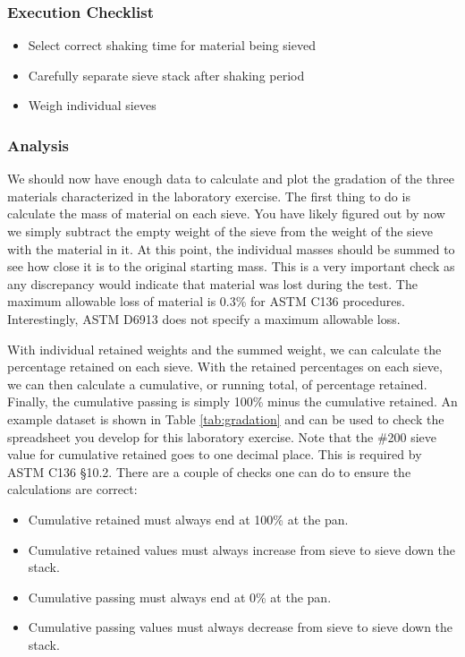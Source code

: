 \documentclass[12pt]{article}
\begin{document}
\subsubsection*{Execution Checklist}
\begin{itemize}
    \item Select correct shaking time for material being sieved
    \item Carefully separate sieve stack after shaking period
    \item Weigh individual sieves
\end{itemize}

\subsubsection{Analysis}
We should now have enough data to calculate and plot the gradation of the three materials characterized in the laboratory exercise. The first thing to do is calculate the mass of material on each sieve. You have likely figured out by now we simply subtract the empty weight of the sieve from the weight of the sieve with the material in it. At this point, the individual masses should be summed to see how close it is to the original starting mass. This is a very important check as any discrepancy would indicate that material was lost during the test. The maximum allowable loss of material is 0.3\% for ASTM C136 procedures. Interestingly, ASTM D6913 does not specify a maximum allowable loss.

With individual retained weights and the summed weight, we can calculate the percentage retained on each sieve. With the retained percentages on each sieve, we can then calculate a cumulative, or running total, of percentage retained. Finally, the cumulative passing is simply 100\% minus the cumulative retained. An example dataset is shown in Table \ref{tab:gradation} and can be used to check the spreadsheet you develop for this laboratory exercise. Note that the \#200 sieve value for cumulative retained goes to one decimal place. This is required by ASTM C136 \S10.2. There are a couple of checks one can do to ensure the calculations are correct:
\begin{itemize}
    \item Cumulative retained must always end at 100\% at the pan.
    \item Cumulative retained values must always increase from sieve to sieve down the stack.
    \item Cumulative passing must always end at 0\% at the pan.
    \item Cumulative passing values must always decrease from sieve to sieve down the stack.
\end{itemize}
\end{document}

